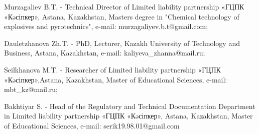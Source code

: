 Murzagaliev B.T. - Technical Director of Limited liability partnership
«ГЦПК «Кəсіпкер», Astana, Kazakhstan, Master\textquotesingle s degree in
"Chemical technology of explosives and pyrotechnics", e-mail:
murzagaliyev.b.t@gmail.com;

Dauletzhanova Zh.T. - PhD, Lecturer, Kazakh University of Technology and
Business, Astana, Kazakhstan, e-mail: kaliyeva\_zhanna@mail.ru;

Seilkhanova M.T. - Researcher of Limited liability partnership «ГЦПК
«Кəсіпкер»,Astana, Kazakhstan, Master of Educational Sciences, e-mail:
mbt\_kz@mail.ru;

Bakhtiyar S. - Head of the Regulatory and Technical Documentation
Department in Limited liability partnership «ГЦПК «Кəсіпкер», Astana,
Kazakhstan, Master of Educational Sciences, e-mail:
serik19.98.01@gmail.com